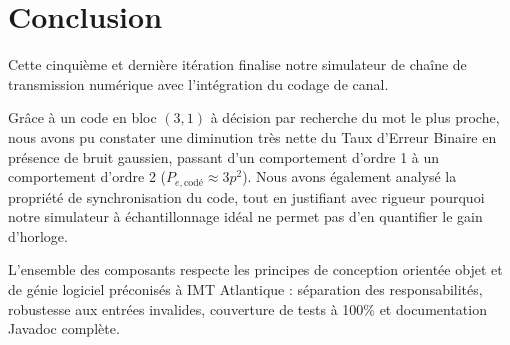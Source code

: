 \documentclass[a4paper,12pt]{report}
\begin{document}
\section{Conclusion}

Cette cinquième et dernière itération finalise notre simulateur de chaîne de transmission numérique avec l'intégration du codage de canal. 

Grâce à un code en bloc $(3, 1)$ à décision par recherche du mot le plus proche, nous avons pu constater une diminution très nette du Taux d'Erreur Binaire en présence de bruit gaussien, passant d'un comportement d'ordre 1 à un comportement d'ordre 2 ($P_{e,\text{codé}} \approx 3p^2$). Nous avons également analysé la propriété de synchronisation du code, tout en justifiant avec rigueur pourquoi notre simulateur à échantillonnage idéal ne permet pas d'en quantifier le gain d'horloge.

L'ensemble des composants respecte les principes de conception orientée objet et de génie logiciel préconisés à IMT Atlantique : séparation des responsabilités, robustesse aux entrées invalides, couverture de tests à 100\% et documentation Javadoc complète.
\thispagestyle{main}


\printglossary[type=main]
\thispagestyle{main}

\printglossary[type=acronym]
\thispagestyle{main}

\end{document}
